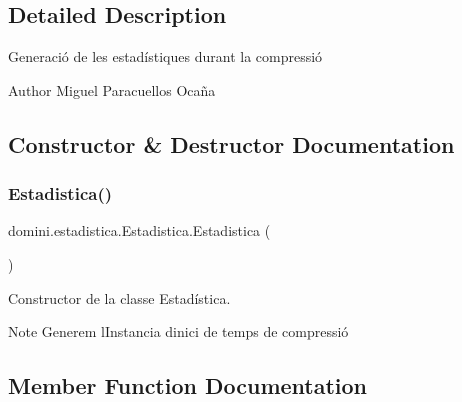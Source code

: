 \subsection{Detailed Description}
Generació de les estadístiques durant la compressió 

\begin{DoxyAuthor}{Author}
Miguel Paracuellos Ocaña 
\end{DoxyAuthor}


\subsection{Constructor \& Destructor Documentation}
\mbox{\label{classdomini_1_1estadistica_1_1Estadistica_a16c37d85709413fd65f8dee111faed49}} 
\subsubsection{\texorpdfstring{Estadistica()}{Estadistica()}}
{\footnotesize\ttfamily domini.\+estadistica.\+Estadistica.\+Estadistica (\begin{DoxyParamCaption}{ }\end{DoxyParamCaption})\hspace{0.3cm}{\ttfamily [inline]}}



Constructor de la classe Estadística. 

\begin{DoxyNote}{Note}
Generem l\textquotesingle{}Instancia d\textquotesingle{}inici de temps de compressió 
\end{DoxyNote}


\subsection{Member Function Documentation}
\mbox{\label{classdomini_1_1estadistica_1_1Estadistica_a6cac6971be817fd985afb8f3b6725464}} 
